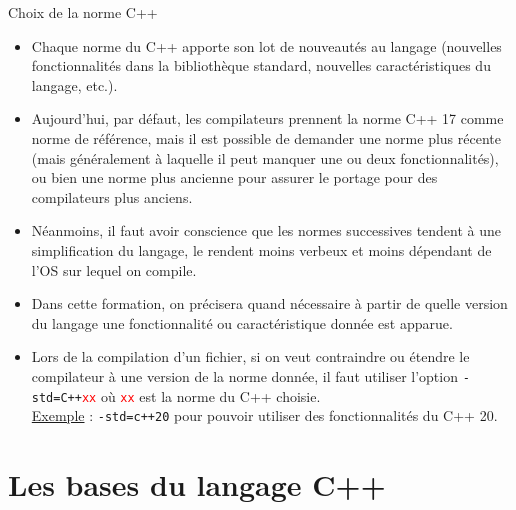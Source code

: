 \documentclass[compress,10pt,aspectratio=169]{beamer}
\begin{document}
\begin{frame}{Choix de la norme C++}
    \scriptsize 
    \begin{itemize}
        \item Chaque norme du C++ apporte son lot de nouveautés au langage (nouvelles fonctionnalités dans la bibliothèque standard, nouvelles caractéristiques du langage, etc.).
        \item Aujourd'hui, par défaut, les compilateurs prennent la norme C++ 17 comme norme de référence, mais il est possible de demander une norme plus récente
              (mais généralement à laquelle il peut manquer une ou deux fonctionnalités), ou bien une norme plus ancienne pour assurer le portage pour des 
              compilateurs plus anciens.
        \item Néanmoins, il faut avoir conscience que les normes successives tendent à une simplification du langage, le rendent moins verbeux et
              moins dépendant de l'OS sur lequel on compile.
        \item Dans cette formation, on précisera quand nécessaire à partir de quelle version du langage une fonctionnalité ou caractéristique donnée
              est apparue.

        \item Lors de la compilation d'un fichier, si on veut contraindre ou étendre le compilateur à une version de la norme donnée, il faut utiliser
              l'option \texttt{-std=C++\textcolor{red}{xx}} où \texttt{\textcolor{red}{xx}} est la norme du C++ choisie.\\
              \underline{Exemple} : \texttt{-std=c++20} pour pouvoir utiliser des fonctionnalités du C++ 20.
    \end{itemize}
\end{frame}

\section{Les bases du langage C++}
\end{document}
